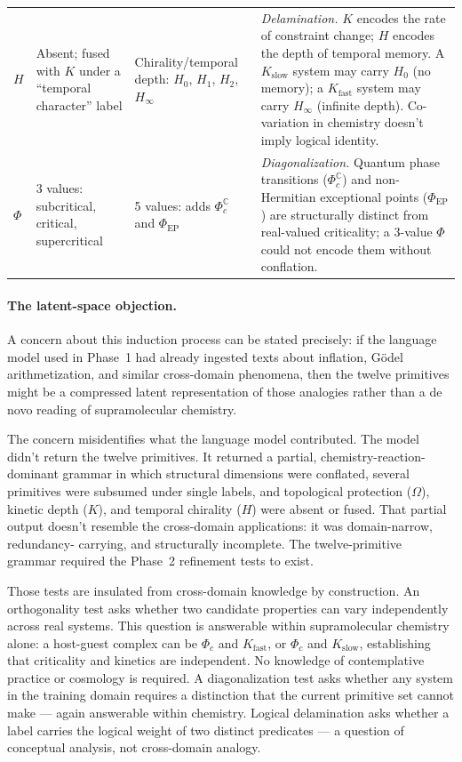 \documentclass[12pt,a4paper]{article}
\newcommand{\Phic}{\Phi_c}
\begin{document}
\begin{table}[htbp]
\begin{tabular}{@{}p{}p{}p{}p{}@{}}
$H$ &
  Absent; fused with $K$ under a ``temporal character'' label &
  Chirality/temporal depth: $H_0$, $H_1$, $H_2$, $H_\infty$ &
  \emph{Delamination.} $K$ encodes the rate of constraint change;
  $H$ encodes the depth of temporal memory.
  A $K_{\text{slow}}$ system may carry $H_0$ (no memory); a
  $K_{\text{fast}}$ system may carry $H_\infty$ (infinite depth).
  Co-variation in chemistry doesn't imply logical identity. \\

$\Phi$ &
  3 values: subcritical, critical, supercritical &
  5 values: adds $\Phi_{c}^{\mathbb{C}}$ and $\Phi_{\text{EP}}$ &
  \emph{Diagonalization.} Quantum phase transitions
  ($\Phi_{c}^{\mathbb{C}}$) and non-Hermitian exceptional points
  ($\Phi_{\text{EP}}$) are structurally distinct from
  real-valued criticality; a 3-value $\Phi$ could not
  encode them without conflation. \\
\bottomrule
\end{tabular}
\end{table}

\paragraph{The latent-space objection.}
A concern about this induction process can be stated precisely: if the
language model used in Phase~1 had already ingested texts about
inflation, G\"{o}del arithmetization, and similar cross-domain phenomena,
then the twelve primitives might be a compressed latent representation of
those analogies rather than a de novo reading of supramolecular chemistry.

The concern misidentifies what the language model contributed.
The model didn't return the twelve primitives. It returned a partial,
chemistry-reaction-dominant grammar in which structural dimensions were
conflated, several primitives were subsumed under single labels, and
topological protection ($\Omega$), kinetic depth ($K$), and temporal
chirality ($H$) were absent or fused. That partial output doesn't
resemble the cross-domain applications: it was domain-narrow, redundancy-
carrying, and structurally incomplete. The twelve-primitive grammar
required the Phase~2 refinement tests to exist.

Those tests are insulated from cross-domain knowledge by construction.
An orthogonality test asks whether two candidate properties can vary
independently across real systems. This question is answerable within
supramolecular chemistry alone: a host-guest complex can be
$\Phic$ and $K_\text{fast}$, or $\Phic$ and $K_\text{slow}$,
establishing that criticality and kinetics are independent.
No knowledge of contemplative practice or cosmology is required.
A diagonalization test asks whether any system in the training domain
requires a distinction that the current primitive set cannot make ---
again answerable within chemistry. Logical delamination asks whether a
label carries the logical weight of two distinct predicates --- a
question of conceptual analysis, not cross-domain analogy.
\end{document}
